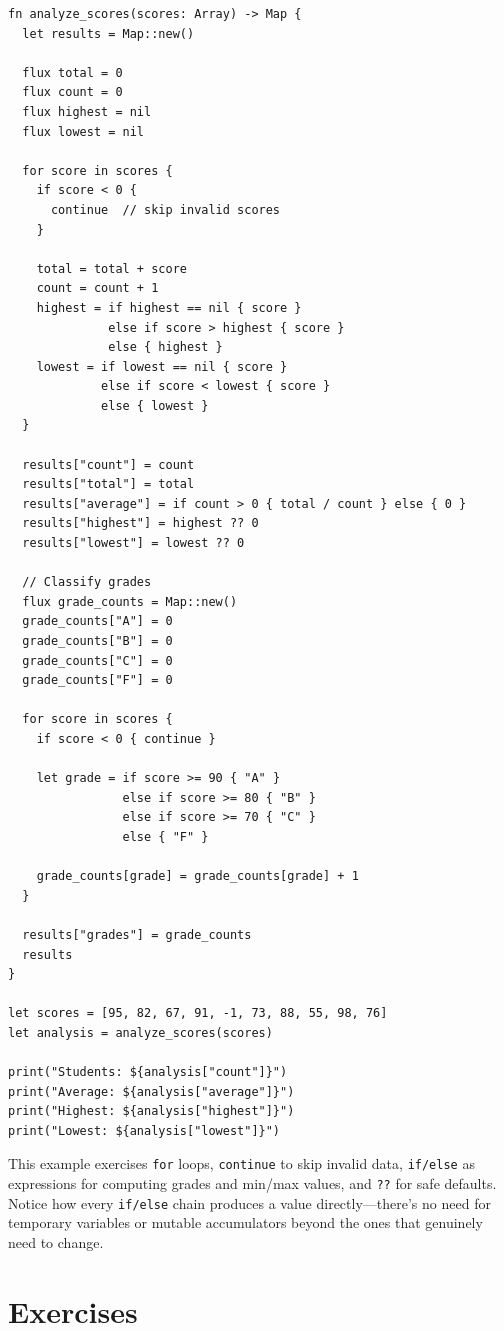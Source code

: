 \begin{lstlisting}[language=Lattice, caption={Comprehensive control flow example}]
fn analyze_scores(scores: Array) -> Map {
  let results = Map::new()

  flux total = 0
  flux count = 0
  flux highest = nil
  flux lowest = nil

  for score in scores {
    if score < 0 {
      continue  // skip invalid scores
    }

    total = total + score
    count = count + 1
    highest = if highest == nil { score }
              else if score > highest { score }
              else { highest }
    lowest = if lowest == nil { score }
             else if score < lowest { score }
             else { lowest }
  }

  results["count"] = count
  results["total"] = total
  results["average"] = if count > 0 { total / count } else { 0 }
  results["highest"] = highest ?? 0
  results["lowest"] = lowest ?? 0

  // Classify grades
  flux grade_counts = Map::new()
  grade_counts["A"] = 0
  grade_counts["B"] = 0
  grade_counts["C"] = 0
  grade_counts["F"] = 0

  for score in scores {
    if score < 0 { continue }

    let grade = if score >= 90 { "A" }
                else if score >= 80 { "B" }
                else if score >= 70 { "C" }
                else { "F" }

    grade_counts[grade] = grade_counts[grade] + 1
  }

  results["grades"] = grade_counts
  results
}

let scores = [95, 82, 67, 91, -1, 73, 88, 55, 98, 76]
let analysis = analyze_scores(scores)

print("Students: ${analysis["count"]}")
print("Average: ${analysis["average"]}")
print("Highest: ${analysis["highest"]}")
print("Lowest: ${analysis["lowest"]}")
\end{lstlisting}

This example exercises \lstinline|for| loops, \lstinline|continue| to skip invalid data, \lstinline|if/else| as expressions for computing grades and min/max values, and \lstinline|??| for safe defaults. Notice how every \lstinline|if/else| chain produces a value directly---there's no need for temporary variables or mutable accumulators beyond the ones that genuinely need to change.

\section{Exercises}\label{sec:control-flow-exercises}

